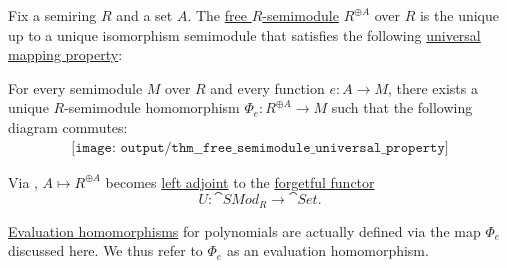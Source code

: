 \begin{theorem}\label{thm:free_semimodule_universal_property}
  Fix a semiring \( R \) and a set \( A \). The \hyperref[def:free_semimodule]{free \( R \)-semimodule} \( R^{\oplus A} \) over \( R \) is the unique up to a unique isomorphism semimodule that satisfies the following \hyperref[rem:universal_mapping_property]{universal mapping property}:
  \begin{displayquote}
    For every semimodule \( M \) over \( R \) and every function \( e: A \to M \), there exists a unique \( R \)-semimodule homomorphism \( \Phi_e: R^{\oplus A} \to M \) such that the following diagram commutes:
    \begin{equation}\label{eq:thm:free_semimodule_universal_property/diagram}
      \begin{aligned}
        \texttt{[image: output/thm\_\_free\_semimodule\_universal\_property]}
      \end{aligned}
    \end{equation}
  \end{displayquote}
\end{theorem}
\begin{comments}
  \item Via , \( A \mapsto R^{\oplus A} \) becomes \hyperref[def:category_adjunction]{left adjoint} to the \hyperref[def:concrete_category]{forgetful functor}
  \begin{equation*}
    U: \cat{SMod}_R \to \cat{Set}.
  \end{equation*}

  \item \hyperref[con:evaluation_homomorphism]{Evaluation homomorphisms} for polynomials are actually defined via the map \( \Phi_e \) discussed here. We thus refer to \( \Phi_e \) as an evaluation homomorphism.
\end{comments}
